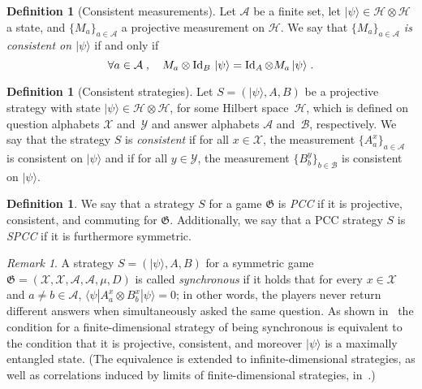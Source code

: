 \documentclass{book}
\theoremstyle{plain}
\theoremstyle{definition}
\newtheorem{definition}[subsection]{Definition}
\theoremstyle{remark}
\newtheorem{remark}[subsection]{Remark}
\numberwithin{equation}{subsection}
\newcommand{\cal}[1]{\mathcal{#1}}
\newcommand{\mH}{\mathcal{H}}
\newcommand{\mA}{\mathcal{A}}
\newcommand{\Id}{\ensuremath{\mathop{\rm Id}\nolimits}}
\newcommand{\ket}[1]{|#1\rangle}
\newcommand{\bra}[1]{\langle#1|}
\newcommand{\game}{\mathfrak{G}}
\newcommand{\strategy}{{S}}
\newcommand{\alice}{A}
\newcommand{\bob}{B}
\begin{document}
\begin{definition}[Consistent measurements]
  \label{def:consistent-measurement}
  Let $\cal{A}$ be a finite set, let $\ket{\psi} \in \mH \otimes \mH$ a
  state, and $\{ M_a \}_{a \in \cal{A}}$ a projective measurement on
  $\mH$.
  We say that \emph{$\{M_a\}_{a \in \cal{A}}$ is consistent on $\ket{\psi}$} if
  and only if
  \begin{equation*}
    \forall a \in \mA\;,\quad M_a \otimes \Id_\bob\, \ket{\psi}
    = \Id_\alice \otimes M_a\, \ket{\psi}\;.
  \end{equation*}
\end{definition}

\begin{definition}[Consistent strategies]
  \label{def:consistent-strategy}
	Let $\strategy = (\ket{\psi}, A, B)$ be a projective strategy with state
  $\ket{\psi} \in \mH \otimes \mH$, for some Hilbert space~$\mH$, which is
  defined on question alphabets $\cal{X}$ and~$\cal{Y}$ and answer alphabets
  $\cal{A}$ and~$\cal{B}$, respectively.
  We say that the strategy $\strategy$ is \emph{consistent} if for all $x \in
  \cal{X}$, the measurement $\{A^x_a\}_{a \in \cal{A}}$ is consistent on
  $\ket{\psi}$ and if for all $y \in \cal{Y}$, the measurement $\{B^y_b\}_{b \in
    \cal{B}}$ is consistent on $\ket{\psi}$.
\end{definition}

\begin{definition}
  \label{def:spcc}
  We say that a strategy $\strategy$ for a game $\game$ is \emph{PCC} if it is projective, consistent, and commuting for $\game$.
  Additionally, we say that a PCC strategy $\strategy$ is \emph{SPCC} if it is furthermore symmetric.
\end{definition}

\begin{remark}
  A strategy $\strategy = (\ket{\psi},A,B)$ for a symmetric game $\game =
  (\cal{X}, \cal{X}, \cal{A}, \cal{A}, \mu, D)$ is called \emph{synchronous} if
  it holds that for every $x\in \cal{X}$ and $a\neq b \in \cal{A}$, $\bra{\psi}
  A^x_a \otimes B^x_b \ket{\psi} = 0$; in other words,
  the players never return different answers when simultaneously asked the same
  question.
  As shown in~\cite{paulsen2016estimating} the condition for a
  finite-dimensional strategy of being synchronous is equivalent to the
  condition that it is projective, consistent, and moreover $\ket{\psi}$ is a
  maximally entangled state.
  (The equivalence is extended to infinite-dimensional strategies, as well as
  correlations induced by limits of finite-dimensional strategies,
  in~\cite{kim2018synchronous}.)
\end{remark}
\end{document}
